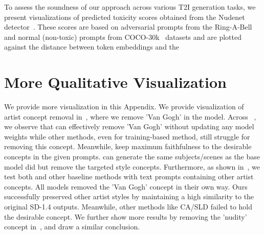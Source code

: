 \label{app:extra}
To assess the soundness of our approach across various T2I generation tasks, we present visualizations of predicted toxicity scores obtained from the Nudenet detector~\citep{nudenet2019}. These scores are based on adversarial prompts from the Ring-A-Bell~\citep{tsai2024ring} and normal (non-toxic) prompts from COCO-30k~\citep{lin2014microsoft} datasets and are plotted against the distance between token embeddings and the  




\section{More Qualitative Visualization} \label{app:vis}
We provide more visualization in this Appendix.
We provide visualization of artist concept removal in~, where we remove 'Van Gogh' in the model. Across ~, we observe that \ours{} can effectively remove 'Van Gogh' without updating any model weights while other methods, even for training-based method, still struggle for removing this concept. Meanwhile, \ours{} keep maximum faithfulness to the desirable concepts in the given prompts. 
\ours{} can generate the same subjects/scenes as the base model did but remove the targeted style concepts. 
Furthermore, as shown in~, we test both \ours{} and other baseline methods with text prompts containing other artist concepts. All models removed the 'Van Gogh' concept in their own way. Ours successfully preserved other artist styles by maintaining a high similarity to the original SD-1.4 outputs. Meanwhile, other methods like CA/SLD failed to hold the desirable concept. We further show more results by removing the 'nudity' concept in~, and draw a similar conclusion.

